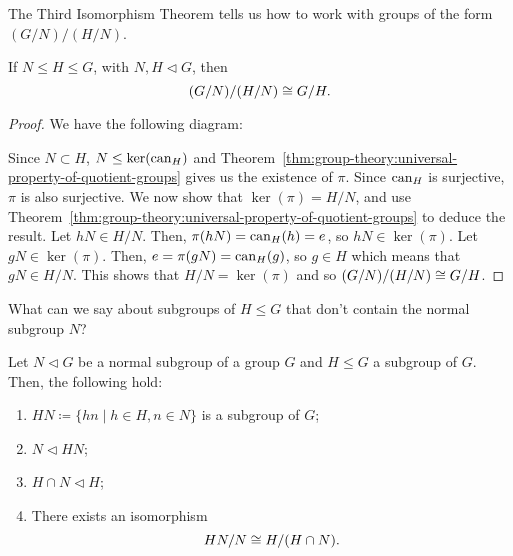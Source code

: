 The Third Isomorphism Theorem tells us how to work with groups of the form \((G/N)/(H/N)\).

\begin{theorem}
  \label{thm:group-theory:the-third-isomorphism-theorem}
  If \(N \leq H \leq G\), with \(N, H \triangleleft G\), then
  \[(G/N)/(H/N) \cong G/H.\]
\end{theorem}

\begin{proof}
  We have the following diagram:
  \begin{center}
  \end{center}

  Since \(N \subset H\), \(N \leq \ker(\operatorname{can}_{H})\) and Theorem~\ref{thm:group-theory:universal-property-of-quotient-groups} gives us the existence of \(\pi\).
  Since \(\operatorname{can}_{H}\) is surjective, \(\pi\) is also surjective.
  We now show that \(\ker(\pi) = H/N\), and use Theorem~\ref{thm:group-theory:universal-property-of-quotient-groups} to deduce the result.
  Let \(hN \in H/N\).
  Then, \(\pi(hN) = \operatorname{can}_{H}(h) = e\), so \(hN \in \ker(\pi)\).
  Let \(gN \in \ker(\pi)\).
  Then, \(e = \pi(gN) = \operatorname{can}_{H}(g)\), so \(g \in H\) which means that \(gN \in H/N\).
  This shows that \(H/N = \ker(\pi)\) and so \((G/N) / (H/N) \cong G/H\).
\end{proof}

What can we say about subgroups of \(H \leq G\) that don't contain the normal subgroup \(N\)?

\begin{theorem}
 \label{thm:group-theory:second-isomorphism-theorem}
 Let \(N \triangleleft G\) be a normal subgroup of a group \(G\) and  \(H \leq G\) a subgroup of \(G\).
 Then, the following hold:
 \begin{enumerate}
 \item
   \(HN \coloneqq \{hn \mid h \in H, n \in N\}\) is a subgroup of \(G\);
 \item
   \(N \triangleleft HN\);
 \item
   \(H \cap N \triangleleft H\);
 \item
   There exists an isomorphism
   \[HN/N \cong H/(H\cap N).\]
 \end{enumerate}
\end{theorem}

